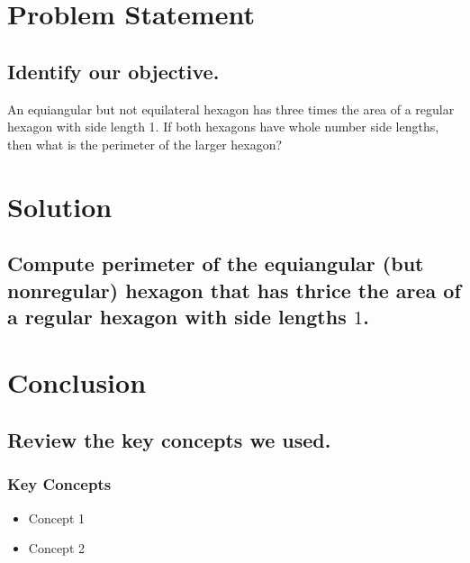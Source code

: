 \documentclass{beamer} %
\begin{document}
\begin{frame} %
  \titlepage
\end{frame}

\section{Problem Statement}

\subsection*{Identify our objective.}

\begin{frame}
An equiangular but not equilateral hexagon has three times the area of a regular hexagon with side length 1. If both hexagons have whole number side lengths, then what is the perimeter of the larger hexagon?
\end{frame}

\section{Solution}

\subsection*{Compute perimeter of the equiangular (but nonregular) hexagon that has thrice the area of a regular hexagon with side lengths $1$.}

\begin{frame}
  \begin{center}
  \end{center}
\end{frame}

\setcounter{equation}{0}

\section{Conclusion}

\subsection*{Review the key concepts we used.}

\begin{frame}
  \frametitle{Key Concepts}
  \pause
  \begin{itemize}
  \item Concept 1 \pause
  \item Concept 2
  \end{itemize}
\end{frame}
\end{document}
